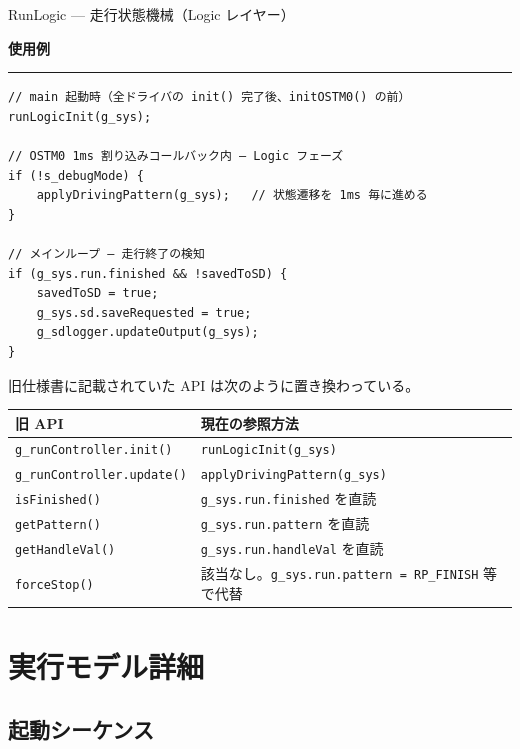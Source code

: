 \documentclass[a4paper,11pt,dvipdfmx]{jsarticle}
\makeatletter
\newcommand{\apisection}[1]{%
  \par\addvspace{4mm}%
  {\normalsize\bfseries\color{headerblue} #1}%
  \par\vspace{-1mm}%
  {\color{accentblue!40}\rule{\linewidth}{0.5pt}}%
  \par\nobreak\vspace{2mm}%
  \@afterheading
}
\makeatother
\begin{document}
\begin{apibox}{RunLogic --- 走行状態機械（Logic レイヤー）}
\apisection{使用例}

\begin{lstlisting}[caption={RunLogic の組み込み例},label=lst:runlogic]
// main 起動時（全ドライバの init() 完了後、initOSTM0() の前）
runLogicInit(g_sys);

// OSTM0 1ms 割り込みコールバック内 — Logic フェーズ
if (!s_debugMode) {
    applyDrivingPattern(g_sys);   // 状態遷移を 1ms 毎に進める
}

// メインループ — 走行終了の検知
if (g_sys.run.finished && !savedToSD) {
    savedToSD = true;
    g_sys.sd.saveRequested = true;
    g_sdlogger.updateOutput(g_sys);
}
\end{lstlisting}

\begin{notebox}
旧仕様書に記載されていた API は次のように置き換わっている。

\begin{tabularx}{\textwidth}{l X}
\toprule
\textbf{旧 API} & \textbf{現在の参照方法} \\
\midrule
\texttt{g\_runController.init()}      & \texttt{runLogicInit(g\_sys)} \\
\texttt{g\_runController.update()}    & \texttt{applyDrivingPattern(g\_sys)} \\
\texttt{isFinished()}                 & \texttt{g\_sys.run.finished} を直読 \\
\texttt{getPattern()}                 & \texttt{g\_sys.run.pattern} を直読 \\
\texttt{getHandleVal()}               & \texttt{g\_sys.run.handleVal} を直読 \\
\texttt{forceStop()}                  & 該当なし。\texttt{g\_sys.run.pattern = RP\_FINISH} 等で代替 \\
\bottomrule
\end{tabularx}
\end{notebox}

\end{apibox}



\section{実行モデル詳細}\label{sec:execution}

\subsection{起動シーケンス}\label{sec:bootseq}
\end{document}
